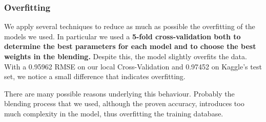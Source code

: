 \documentclass[10pt,conference,compsocconf]{IEEEtran}
\begin{document}
%
%

\subsubsection{Overfitting}
We apply several techniques to reduce as much as possible the overfitting of the models we used. In
particular we used a \textbf{5-fold cross-validation both to determine the best parameters for each model and to
choose the best weights in the blending.}
Despite this, the model slightly overfits the data. With a 0.95962 RMSE on our local Cross-Validation and 0.97452 on Kaggle's test set, we notice a small difference that indicates overfitting.

There are many possible reasons underlying this behaviour. Probably the blending process that we
used, although the proven accuracy, introduces too much complexity in the model, thus overfitting
the training database.







\end{document}
